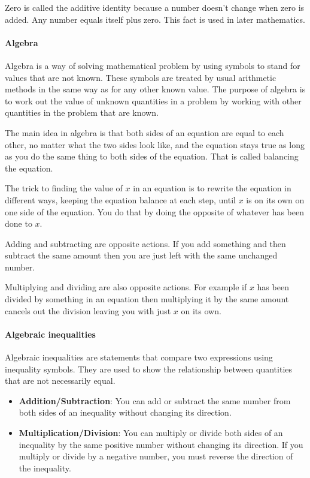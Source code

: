 \documentclass[12pt]{article}
\begin{document}
Zero is called the additive identity because a number doesn’t change when zero is added. Any number equals itself plus zero. This fact is used in later mathematics.

\paragraph{Algebra}
Algebra is a way of solving mathematical problem by using symbols to stand for values that are not known. These symbols are treated by usual arithmetic methods in the same way as for any other known value. The purpose of algebra is to work out the value of unknown quantities in a problem by working with other quantities in the problem that are known.

The main idea in algebra is that both sides of an equation are equal to each other, no matter what the two sides look like, and the equation stays true as long as you do the same thing to both sides of the equation. That is called balancing the equation.

The trick to finding the value of $x$ in an equation is to rewrite the equation in different ways, keeping the equation balance at each step, until $x$ is on its own on one side of the equation. You do that by doing the opposite of whatever has been done to $x$.

Adding and subtracting are opposite actions. If you add something and then subtract the same amount then you are just left with the same unchanged number.

Multiplying and dividing are also opposite actions. For example if $x$ has been divided by something in an equation then multiplying it by the same amount cancels out the division leaving you with just $x$ on its own.

\paragraph{Algebraic inequalities}
Algebraic inequalities are statements that compare two expressions using inequality symbols. They are used to show the relationship between quantities that are not necessarily equal.

\begin{itemize}
    \item \textbf{Addition/Subtraction}: You can add or subtract the same number from both sides of an inequality without changing its direction.
    \item \textbf{Multiplication/Division}: You can multiply or divide both sides of an inequality by the same positive number without changing its direction. If you multiply or divide by a negative number, you must reverse the direction of the inequality.
\end{itemize}
\end{document}
